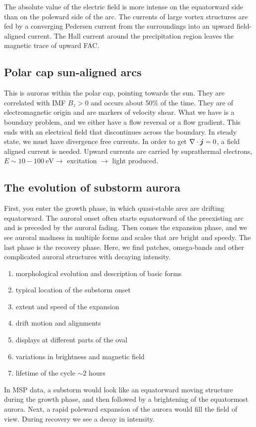 The absolute value of the electric field is more intense on the equatorward side than on the poleward side of the arc. The currents of large vortex structures are fed by a converging Pedersen current from the surroundings into an upward field-aligned current. The Hall current around the precipitation region leaves the magnetic trace of upward FAC\@.

\subsection{Polar cap sun-aligned arcs}\label{subsec:sun_aligned_arcs}
This is auroras within the polar cap, pointing towards the sun. They are correlated with IMF \(B_z>0\) and occurs about 50\% of the time. They are of electromagnetic origin and are markers of velocity shear. What we have is a boundary problem, and we either have a flow reversal or a flow gradient. This ends with an electrical field that discontinues across the boundary. In steady state, we must have divergence free currents. In order to get \(\nabla\cdot\boldsymbol{j}=0\), a field aligned current is needed. Upward currents are carried by suprathermal electrons, \(E\sim 10-\SI{100}{\electronvolt}\rightarrow \) excitation \(\rightarrow \) light produced.

\subsection{The evolution of substorm aurora}
First, you enter the growth phase, in which quasi-stable arcs are drifting equatorward. The auroral onset often starts equatorward of the preexisting arc and is preceded by the auroral fading. Then comes the expansion phase, and we see auroral madness in multiple forms and scales that are bright and speedy. The last phase is the recovery phase. Here, we find patches, omega-bands and other complicated auroral structures with decaying intensity.
\begin{enumerate}
    \item morphological evolution and description of basic forms
    \item typical location of the substorm onset
    \item extent and speed of the expansion
    \item drift motion and alignments
    \item displays at different parts of the oval
    \item variations in brightness and magnetic field
    \item lifetime of the cycle \(\sim 2\) hours
\end{enumerate}
In MSP data, a substorm would look like an equatorward moving structure during the growth phase, and then followed by a brightening of the equatormost aurora. Next, a rapid poleward expansion of the aurora would fill the field of view. During recovery we see a decay in intensity.

